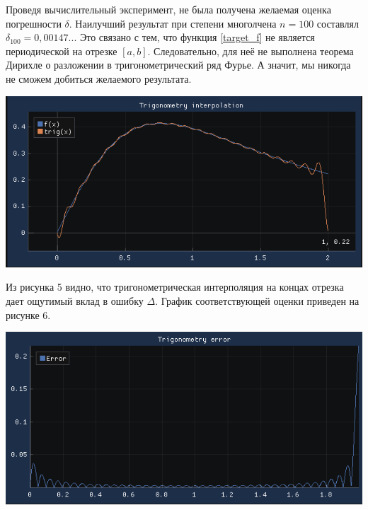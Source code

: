 \documentclass[a4paper, fontsize=14pt]{article}
\begin{document}
    Проведя вычислительный эксперимент, не была получена желаемая оценка погрешности $\delta$. Наилучший результат при степени многолчена $n=100$ составлял $\delta_{100} = 0,00147..$. Это связано с тем, что функция \eqref{target_f} не является периодической на отрезке $[a, b]$. Следовательно, для неё не выполнена теорема Дирихле о разложении в тригонометрический ряд Фурье. А значит, мы никогда не сможем добиться желаемого результата.
    \begin{center}
        \includegraphics[]{src/trig_plot.png}
    \end{center}
    
    Из рисунка 5 видно, что тригонометрическая интерполяция на концах отрезка дает ощутимый вклад в ошибку $\Delta$.
    График соответствующей оценки приведен на рисунке 6.

    \begin{center}
        \includegraphics[]{src/trig_error.png}
    \end{center}
\end{document}
